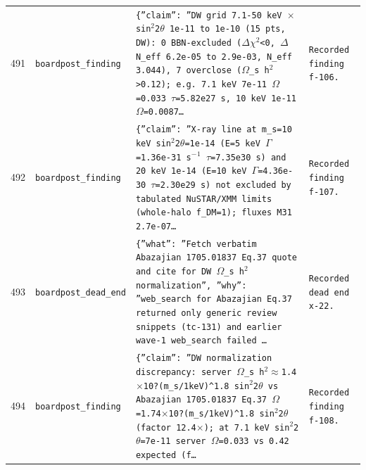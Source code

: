 \documentclass[11pt,a4paper]{article}
\begin{document}
\begin{longtable}{@{}p{}p{}p{}p{}@{}}
491 & \texttt{board}\newline\texttt{post\_\allowbreak{}finding} & \texttt{\{''claim'':\allowbreak{} ''DW grid 7.1-50 keV $\times$ sin$^2$2$\theta$ 1e-11 to 1e-10 (15 pts,\allowbreak{} DW)\allowbreak{}:\allowbreak{} 0 BBN-excluded ($\Delta$$\chi$$^2$\textless{}\allowbreak{}0,\allowbreak{} $\Delta$N\_\allowbreak{}eff 6.2e-05 to 2.9e-03,\allowbreak{} N\_\allowbreak{}eff 3.044)\allowbreak{},\allowbreak{} 7 overclose ($\Omega$\_\allowbreak{}s h$^2$\textgreater{}\allowbreak{}0.12)\allowbreak{};\allowbreak{} e.g. 7.1 keV 7e-11 $\Omega$=\allowbreak{}0.033 $\tau$=\allowbreak{}5.82e27 s,\allowbreak{} 10 keV 1e-11 $\Omega$=\allowbreak{}0.0087\ldots{}\allowbreak{}} & \texttt{Recorded finding f-106.} \\
492 & \texttt{board}\newline\texttt{post\_\allowbreak{}finding} & \texttt{\{''claim'':\allowbreak{} ''X-ray line at m\_\allowbreak{}s=\allowbreak{}10 keV sin$^2$2$\theta$=\allowbreak{}1e-14 (E=\allowbreak{}5 keV $\Gamma$=\allowbreak{}1.36e-31 s$^-$$^1$ $\tau$=\allowbreak{}7.35e30 s)\allowbreak{} and 20 keV 1e-14 (E=\allowbreak{}10 keV $\Gamma$=\allowbreak{}4.36e-30 $\tau$=\allowbreak{}2.30e29 s)\allowbreak{} not excluded by tabulated NuSTAR/\allowbreak{}XMM limits (whole-halo f\_\allowbreak{}DM=\allowbreak{}1)\allowbreak{};\allowbreak{} fluxes M31 2.7e-07\ldots{}\allowbreak{}} & \texttt{Recorded finding f-107.} \\
493 & \texttt{board}\newline\texttt{post\_\allowbreak{}dead\_\allowbreak{}end} & \texttt{\{''what'':\allowbreak{} ''Fetch verbatim Abazajian 1705.01837 Eq.37 quote and cite for DW $\Omega$\_\allowbreak{}s h$^2$ normalization'',\allowbreak{} ''why'':\allowbreak{} ''web\_\allowbreak{}search for Abazajian Eq.37 returned only generic review snippets (tc-131)\allowbreak{} and earlier wave-1 web\_\allowbreak{}search failed \ldots{}\allowbreak{}} & \texttt{Recorded dead end x-22.} \\
494 & \texttt{board}\newline\texttt{post\_\allowbreak{}finding} & \texttt{\{''claim'':\allowbreak{} ''DW normalization discrepancy:\allowbreak{} server $\Omega$\_\allowbreak{}s h$^2$$\approx$1.4$\times$10?(m\_\allowbreak{}s/\allowbreak{}1keV)\allowbreak{}\textasciicircum{}\allowbreak{}1.8 sin$^2$2$\theta$ vs Abazajian 1705.01837 Eq.37 $\Omega$=\allowbreak{}1.74$\times$10?(m\_\allowbreak{}s/\allowbreak{}1keV)\allowbreak{}\textasciicircum{}\allowbreak{}1.8 sin$^2$2$\theta$ (factor 12.4$\times$)\allowbreak{};\allowbreak{} at 7.1 keV sin$^2$2$\theta$=\allowbreak{}7e-11 server $\Omega$=\allowbreak{}0.033 vs 0.42 expected (f\ldots{}\allowbreak{}} & \texttt{Recorded finding f-108.} \\

\end{longtable}
\end{document}
